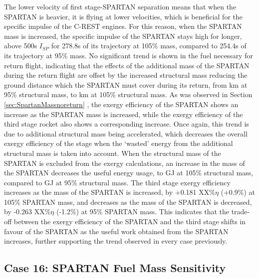  The lower velocity of first stage-SPARTAN separation means that when the SPARTAN is heavier, it is flying at lower velocities, which is beneficial for the specific impulse of the C-REST engines. For this reason, when the SPARTAN mass is increased, the specific impulse of the SPARTAN stays high for longer, above 500s $I_{SP}$ for 278.8s of its trajectory at 105\% mass, compared to 254.4s of its trajectory at 95\% mass. 
 No  significant trend is shown in the fuel necessary for return flight, indicating that the effects of the  additional mass of the SPARTAN during the return flight are offset by the increased structural mass reducing the ground distance which the SPARTAN must cover during its return, from \returnDistmSPARTANNinetyFive km at 95\% structural mass, to \returnDistmSPARTANOneHundredFive km at 105\% structural mass. 
As was observed in Section \ref{sec:SpartanMassnoreturn} , the exergy efficiency of the SPARTAN shows an increase as the SPARTAN mass is increased, while the exergy efficiency of the third stage rocket also shows a corresponding increase. 
Once again, this trend is due to additional structural mass being accelerated, which decreases the overall exergy efficiency of the stage when the `wasted' energy from the additional structural mass is taken into account. When the structural mass of the SPARTAN is excluded from the exergy calculations, an increase in the mass of the SPARTAN decreases the useful energy usage, to \secondExergythirdStagemSPARTANOneHundredFive GJ at 105\% structural mass, compared to \secondExergythirdStagemSPARTANNinetyFive GJ at 95\% structural mass. 
The third stage exergy efficiency increases as the mass of the SPARTAN is increased, by +0.181 XX\%$\eta$ (+0.9\%) at 105\% SPARTAN mass, and decreases as the mass of the SPARTAN is decreased, by -0.263 XX\%$\eta$ (-1.2\%) at 95\% SPARTAN mass. This indicates that the trade-off between the exergy efficiency of the SPARTAN and the third stage shifts in favour of the SPARTAN as the useful work obtained from the SPARTAN increases, further supporting the trend observed in every case previously. 





\subsection{Case 16: SPARTAN Fuel Mass Sensitivity}

